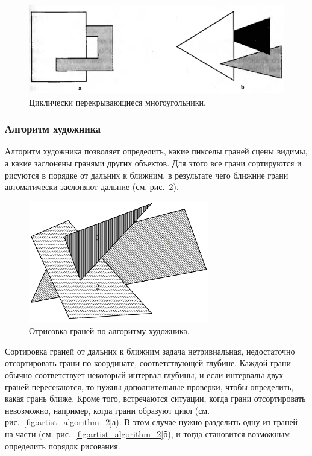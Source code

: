 \begin{figure}[H]
    \centering
    \includegraphics[width=\textwidth]{img/veyler-aserton_algorithm_4.png}
    \caption{Циклически перекрывающиеся многоугольники.}
    \label{fig:veyler-aserton_algorithm_4}
\end{figure}


\subsubsection{Алгоритм художника}

\hspace{1.25cm}
Алгоритм художника позволяет определить, какие пикселы граней сцены видимы, а какие заслонены гранями других объектов. Для этого все грани сортируются и рисуются в порядке от дальних к ближним, в результате чего ближние грани автоматически заслоняют дальние (см. рис.~\ref{fig:artist_algorithm_1}).

\begin{figure}[H]
    \centering
    \includegraphics[width=0.7\textwidth]{img/artist_algorithm_1.png}
    \caption{Отрисовка граней по алгоритму художника.}
    \label{fig:artist_algorithm_1}
\end{figure}

Сортировка граней от дальних к ближним задача нетривиальная, недостаточно отсортировать грани по координате, соответствующей глубине. Каждой грани обычно соответствует некоторый интервал глубины, и если интервалы двух граней пересекаются, то нужны дополнительные проверки, чтобы определить, какая грань ближе. Кроме того, встречаются ситуации, когда грани отсортировать невозможно, например, когда грани образуют цикл (см. рис.~\ref{fig:artist_algorithm_2}а). В этом случае нужно разделить одну из граней на части (см. рис.~\ref{fig:artist_algorithm_2}б), и тогда становится возможным определить порядок рисования.


